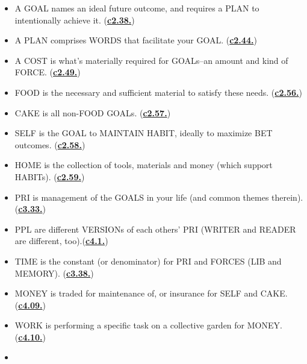 \documentclass[
]{book}
\providecommand{\tightlist}{%
  \setlength{\itemsep}{0pt}\setlength{\parskip}{0pt}}
\begin{document}
\begin{itemize}
\tightlist
\item
  A GOAL names an ideal future outcome, and requires a PLAN to intentionally achieve it. (\protect\hyperlink{core-concepts}{\textbf{c2.38.}})\\
\item
  A PLAN comprises WORDS that facilitate your GOAL. (\protect\hyperlink{core-concepts}{\textbf{c2.44.}})\\
\item
  A COST is what's materially required for GOALs--an amount and kind of FORCE. (\protect\hyperlink{core-concepts}{\textbf{c2.49.}})\\
\item
  FOOD is the necessary and sufficient material to satisfy these needs. (\protect\hyperlink{self-1}{\textbf{c2.56.}})\\
\item
  CAKE is all non-FOOD GOALs. (\protect\hyperlink{self-1}{\textbf{c2.57.}})\\
\item
  SELF is the GOAL to MAINTAIN HABIT, ideally to maximize BET outcomes. (\protect\hyperlink{self-1}{\textbf{c2.58.}})\\
\item
  HOME is the collection of tools, materials and money (which support HABITs). (\protect\hyperlink{home}{\textbf{c2.59.}})\\
\item
  PRI is management of the GOALS in your life (and common themes therein). (\protect\hyperlink{attention-and-time}{\textbf{c3.33.}})\\
\item
  PPL are different VERSIONs of each others' PRI (WRITER and READER are different, too).(\protect\hyperlink{ppl}{\textbf{c4.1.}})\\
\item
  TIME is the constant (or denominator) for PRI and FORCES (LIB and MEMORY). (\protect\hyperlink{attention-and-time}{\textbf{c3.38.}})\\
\item
  MONEY is traded for maintenance of, or insurance for SELF and CAKE. (\protect\hyperlink{ppl}{\textbf{c4.09.}})\\
\item
  WORK is performing a specific task on a collective garden for MONEY. (\protect\hyperlink{work}{\textbf{c4.10.}})\\
\item

\end{itemize}
\end{document}
